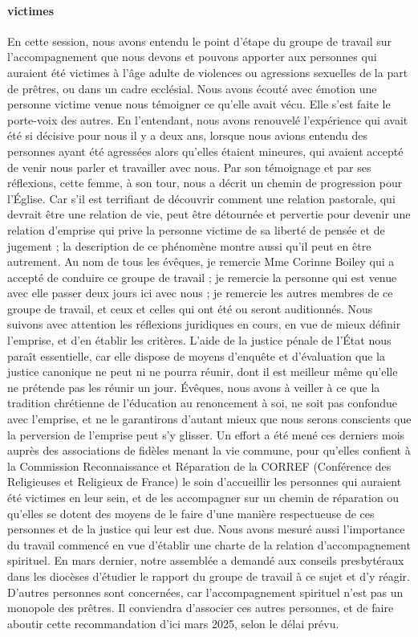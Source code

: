 \paragraph{victimes}
En cette session, nous avons entendu le point d’étape du groupe de travail sur l’accompagnement que nous devons et pouvons apporter aux personnes qui auraient été victimes à l’âge adulte de violences ou agressions sexuelles de la part de prêtres, ou dans un cadre ecclésial. Nous avons écouté avec émotion une personne victime venue nous témoigner ce qu’elle avait vécu. Elle s’est faite le porte-voix des autres. En l’entendant, nous avons renouvelé l’expérience qui avait été si décisive pour nous il y a deux ans, lorsque nous avions entendu des personnes ayant été agressées alors qu’elles étaient mineures, qui avaient accepté de venir nous parler et travailler avec nous. Par son témoignage et par ses réflexions, cette femme, à son tour, nous a décrit un chemin de progression pour l’Église. Car s’il est terrifiant de découvrir comment une relation pastorale, qui devrait être une relation de vie, peut être détournée et pervertie pour devenir une relation d’emprise qui prive la personne victime de sa liberté de pensée et de jugement ; la description de ce phénomène montre aussi qu’il peut en être autrement. Au nom de tous les évêques, je remercie Mme Corinne Boiley qui a accepté de conduire ce groupe de travail ; je remercie la personne qui est venue avec elle passer deux jours ici avec nous ; je remercie les autres membres de ce groupe de travail, et ceux et celles qui ont été ou seront
auditionnés. Nous suivons avec attention les réflexions juridiques en cours, en vue de mieux définir l’emprise, et d’en établir les critères. L’aide de la justice pénale de l’État nous paraît essentielle, car elle dispose de moyens d’enquête et d’évaluation que la justice canonique ne peut ni ne pourra réunir, dont il est meilleur même qu’elle ne prétende pas les réunir un jour. Évêques, nous avons à veiller à ce que la tradition chrétienne de l’éducation au renoncement à soi, ne soit pas confondue avec l’emprise, et ne le garantirons d’autant mieux que nous serons conscients que la perversion de l’emprise peut s’y glisser. Un effort a été mené ces derniers mois auprès des associations de fidèles menant la vie commune, pour qu’elles confient à la Commission Reconnaissance et Réparation de la CORREF (Conférence des Religieuses et Religieux de France) le soin d’accueillir les personnes qui auraient été victimes en leur sein, et de les accompagner sur un chemin de réparation ou qu’elles se dotent des moyens de le faire d’une manière respectueuse de ces personnes et de la justice qui leur est due. Nous avons mesuré aussi l’importance du travail commencé en vue d’établir une charte de la relation d’accompagnement spirituel. En mars dernier, notre assemblée a demandé aux conseils presbytéraux dans les diocèses d’étudier le rapport du groupe de travail à ce sujet et d’y réagir. D’autres personnes sont concernées, car l’accompagnement spirituel n’est pas un monopole des prêtres. Il conviendra d’associer ces autres personnes, et de faire aboutir cette recommandation d’ici mars 2025, selon le délai prévu.
